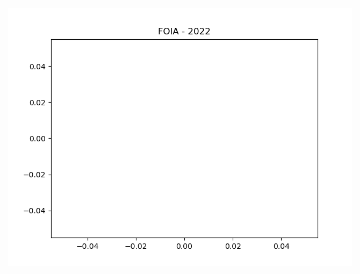 \documentclass{article}
\begin{document}
\begin{figure}[H]
\begin{subfigure}{.5\textwidth}
        \includegraphics[width=\textwidth]{../../output/figures/annual_source_distribution/FOIA_data_dist_2022.png}
    \end{subfigure}
\end{figure}
\end{document}
